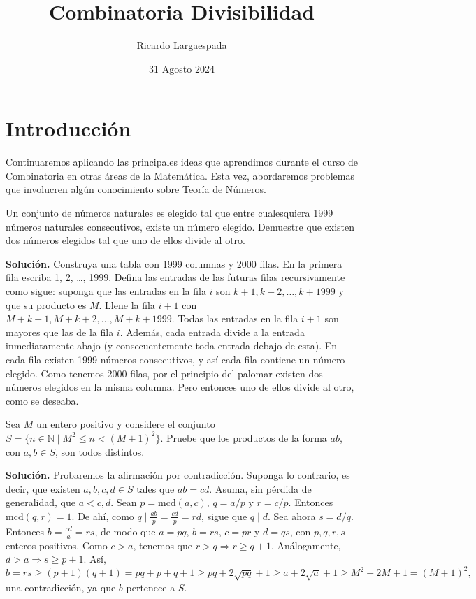 \documentclass[11pt]{scrartcl}
\begin{document}
\title{Combinatoria Divisibilidad}
\author{Ricardo Largaespada}
\date{31 Agosto 2024}

\maketitle

\section{Introducción}

Continuaremos aplicando las principales ideas que aprendimos durante el curso de Combinatoria en otras áreas de la Matemática. Esta vez, abordaremos problemas que involucren algún conocimiento sobre Teoría de Números.


\begin{example}[Rusia 1999]
Un conjunto de números naturales es elegido tal que entre cualesquiera 1999 números naturales consecutivos, existe un número elegido. Demuestre que existen dos números elegidos tal que uno de ellos divide al otro.
\end{example}
\textbf{Solución.} Construya una tabla con 1999 columnas y 2000 filas. En la primera fila escriba 1, 2, \dots, 1999. Defina las entradas de las futuras filas recursivamente como sigue: suponga que las entradas en la fila $i$ son $k + 1, k + 2, \dots, k + 1999$ y que su producto es $M$. Llene la fila $i + 1$ con $M + k + 1, M + k + 2, \dots, M + k + 1999$. Todas las entradas en la fila $i + 1$ son mayores que las de la fila $i$. Además, cada entrada divide a la entrada inmediatamente abajo (y consecuentemente toda entrada debajo de esta). En cada fila existen 1999 números consecutivos, y así cada fila contiene un número elegido. Como tenemos 2000 filas, por el principio del palomar existen dos números elegidos en la misma columna. Pero entonces uno de ellos divide al otro, como se deseaba.

\begin{example}[India 1998]
Sea $M$ un entero positivo y considere el conjunto $S = \{n \in \mathbb{N} \mid M^2 \leq n < (M + 1)^2\}$. Pruebe que los productos de la forma $ab$, con $a, b \in S$, son todos distintos.
\end{example}
\textbf{Solución.} Probaremos la afirmación por contradicción. Suponga lo contrario, es decir, que existen $a, b, c, d \in S$ tales que $ab = cd$. Asuma, sin pérdida de generalidad, que $a < c, d$. Sean $p = \text{mcd}(a, c)$, $q = a/p$ y $r = c/p$. Entonces $\text{mcd}(q, r) = 1$. De ahí, como $q \mid \frac{ab}{p} = \frac{cd}{p} = rd$, sigue que $q \mid d$. Sea ahora $s = d/q$. Entonces $b = \frac{cd}{a} = rs$, de modo que $a = pq$, $b = rs$, $c = pr$ y $d = qs$, con $p, q, r, s$ enteros positivos. Como $c > a$, tenemos que $r > q \Rightarrow r \geq q + 1$. Análogamente, $d > a \Rightarrow s \geq p + 1$. Así,
\[
b = rs \geq (p + 1)(q + 1) = pq + p + q + 1 \geq pq + 2\sqrt{pq} + 1 \geq a + 2\sqrt{a} + 1 \geq M^2 + 2M + 1 = (M + 1)^2,
\]
una contradicción, ya que $b$ pertenece a $S$.
\end{document}
